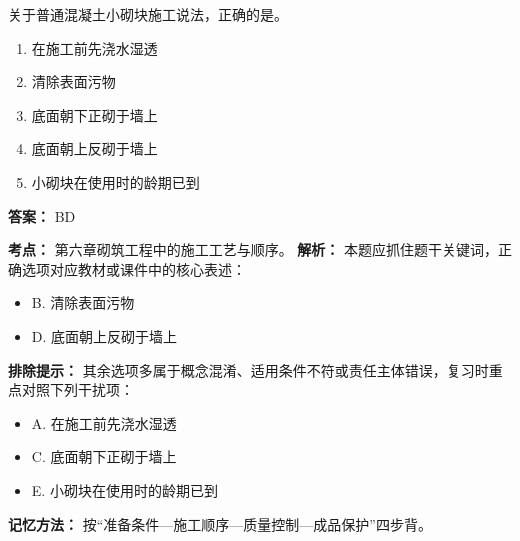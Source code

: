 \documentclass[UTF8,fontset=fandol,11pt]{ctexart}
\begin{document}
\begin{quizbox}[title={第 27 题}]
关于普通混凝土小砌块施工说法，正确的是。\\
\begin{enumerate}[label=\Alph*.]
\item 在施工前先浇水湿透
\item 清除表面污物
\item 底面朝下正砌于墙上
\item 底面朝上反砌于墙上
\item 小砌块在使用时的龄期已到
\end{enumerate}
\textbf{答案：} BD
\vspace{0.25em}
\begin{answerbox}[title={考点解析}]
\textbf{考点：} 第六章砌筑工程中的施工工艺与顺序。
\textbf{解析：} 本题应抓住题干关键词，正确选项对应教材或课件中的核心表述：
\begin{itemize}
\item B. 清除表面污物
\item D. 底面朝上反砌于墙上
\end{itemize}
\textbf{排除提示：} 其余选项多属于概念混淆、适用条件不符或责任主体错误，复习时重点对照下列干扰项：
\begin{itemize}
\item A. 在施工前先浇水湿透
\item C. 底面朝下正砌于墙上
\item E. 小砌块在使用时的龄期已到
\end{itemize}
\textbf{记忆方法：} 按“准备条件—施工顺序—质量控制—成品保护”四步背。
\end{answerbox}
\end{quizbox}

\vspace{0.2em}
\end{document}
